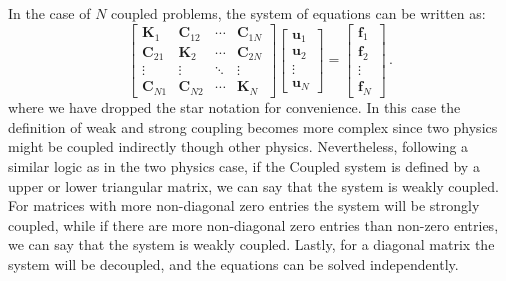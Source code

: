     In the case of $N$ coupled problems, the system of equations can be written
    as:
    \begin{equation} \label{eq:multiphysics_strong}
        \begin{bmatrix}
            \mathbf{K}_1    & \mathbf{C}_{12} & \cdots & \mathbf{C}_{1N} \\
            \mathbf{C}_{21} & \mathbf{K}_2    & \cdots & \mathbf{C}_{2N} \\
            \vdots          & \vdots          & \ddots & \vdots          \\
            \mathbf{C}_{N1} & \mathbf{C}_{N2} & \cdots & \mathbf{K}_N
        \end{bmatrix}
        \begin{bmatrix}
            \mathbf{u}_1 \\
            \mathbf{u}_2 \\
            \vdots       \\
            \mathbf{u}_N
        \end{bmatrix}
        =
        \begin{bmatrix}
            \mathbf{f}_1 \\
            \mathbf{f}_2 \\
            \vdots       \\
            \mathbf{f}_N
        \end{bmatrix}\,.
    \end{equation}
    where we have dropped the star notation for convenience. In this case the
    definition of weak and strong coupling
    becomes more complex since two physics might be coupled indirectly though other
    physics. Nevertheless, following a similar logic as in the two physics case, if
    the Coupled
    system is defined by a upper or lower triangular matrix, we can say that the
    system is weakly coupled. For matrices with more non-diagonal
    zero entries the system will be strongly coupled, while if there are more
    non-diagonal zero entries than non-zero entries, we can say that the system is
    weakly coupled. Lastly,
    for a diagonal matrix the system will be decoupled, and the equations can be
    solved independently.

